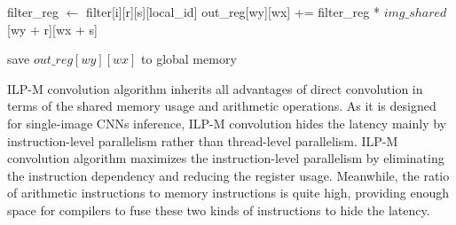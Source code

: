 \documentclass{article}
\begin{document}
\begin{algorithm}
\begin{algorithmic}[1]
                \State filter\_reg $\gets$ filter[i][r][s][local\_id] 
                        \State out\_reg[wy][wx] += filter\_reg * $img\_shared$[wy + r][wx + s]
                    \EndFor
                \EndFor
            \EndFor
        \EndFor
        \State
    
    \EndFor
    \State
    
            \State save $out\_reg[wy][wx]$ to global memory
        \EndFor
    \EndFor

\EndFunction


\end{algorithmic}
\end{algorithm}



ILP-M convolution algorithm inherits all advantages of direct convolution in terms of the shared memory usage and arithmetic operations. As it is designed for single-image CNNs inference, ILP-M convolution hides the latency mainly by instruction-level parallelism rather than thread-level parallelism. ILP-M convolution algorithm maximizes the instruction-level parallelism by eliminating the instruction dependency and reducing the register usage. Meanwhile, the ratio of arithmetic instructions to memory instructions is quite high, providing enough space for compilers to fuse these two kinds of instructions to hide the latency.


\end{document}
